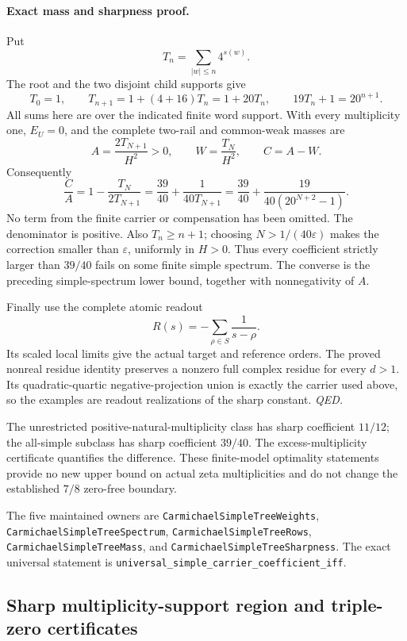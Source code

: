 \paragraph{Exact mass and sharpness proof.}
Put
\[
 T_n=\sum_{|w|\le n}4^{s(w)}.
\]
The root and the two disjoint child supports give
\[
 T_0=1,\qquad T_{n+1}=1+(4+16)T_n=1+20T_n,\qquad
 19T_n+1=20^{n+1}.
\]
All sums here are over the indicated finite word support.
With every multiplicity one, \(E_U=0\), and the complete two-rail and
common-weak masses are
\[
 A=\frac{2T_{N+1}}{H^2}>0,\qquad W=\frac{T_N}{H^2},\qquad C=A-W.
\]
Consequently
\[
 \frac CA
 =1-\frac{T_N}{2T_{N+1}}
 =\frac{39}{40}+\frac1{40T_{N+1}}
 =\frac{39}{40}
       +\frac{19}{40(20^{N+2}-1)}.
\]
No term from the finite carrier or compensation has been omitted.
The denominator is positive. Also \(T_n\ge n+1\); choosing
\(N>1/(40\varepsilon)\) makes the correction smaller than
\(\varepsilon\), uniformly in \(H>0\).
Thus every coefficient strictly larger than \(39/40\) fails on some
finite simple spectrum. The converse is the preceding simple-spectrum
lower bound, together with nonnegativity of \(A\).

Finally use the complete atomic readout
\[
 R(s)=-\sum_{\rho\in S}\frac1{s-\rho}.
\]
Its scaled local limits give the actual target and reference orders.
The proved nonreal residue identity preserves a nonzero full complex
residue for every \(d>1\). Its quadratic-quartic negative-projection
union is exactly the carrier used above, so the examples are readout
realizations of the sharp constant.
\hfill\textit{QED.}

The unrestricted positive-natural-multiplicity class has sharp
coefficient \(11/12\); the all-simple subclass has sharp coefficient
\(39/40\). The excess-multiplicity certificate quantifies the difference.
These finite-model optimality statements provide no new upper bound on
actual zeta multiplicities and do not change the established \(7/8\)
zero-free boundary.

The five maintained owners are \texttt{CarmichaelSimpleTreeWeights},
\texttt{CarmichaelSimpleTreeSpectrum}, \texttt{CarmichaelSimpleTreeRows},
\texttt{CarmichaelSimpleTreeMass}, and \texttt{CarmichaelSimpleTreeSharpness}.
The exact universal statement is
\texttt{universal\_simple\_carrier\_coefficient\_iff}.

\subsection{Sharp multiplicity-support region and triple-zero certificates}
\label{sec:multiplicity-support-region}

